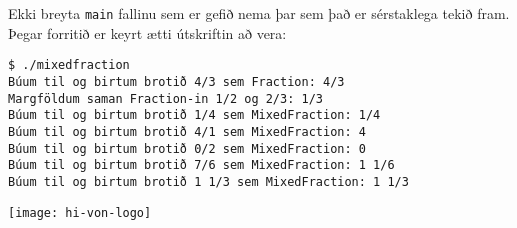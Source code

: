 \documentclass{article}
\begin{document}
Ekki breyta \texttt{main} fallinu sem er gefið nema þar sem það er sérstaklega tekið fram. Þegar forritið er keyrt ætti útskriftin að vera:

\begin{verbatim}
$ ./mixedfraction
Búum til og birtum brotið 4/3 sem Fraction: 4/3
Margföldum saman Fraction-in 1/2 og 2/3: 1/3
Búum til og birtum brotið 1/4 sem MixedFraction: 1/4
Búum til og birtum brotið 4/1 sem MixedFraction: 4
Búum til og birtum brotið 0/2 sem MixedFraction: 0
Búum til og birtum brotið 7/6 sem MixedFraction: 1 1/6
Búum til og birtum brotið 1 1/3 sem MixedFraction: 1 1/3
\end{verbatim}

\vfill
\texttt{[image: hi-von-logo]}
\end{document}
